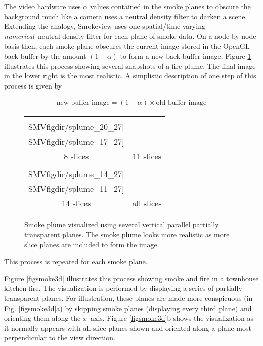 {The video hardware uses $\alpha$ values contained in the smoke
planes to obscure the background much like a camera uses a neutral
density filter to darken a scene.  Extending the analogy,
Smokeview uses one spatial/time varying {\em numerical}\ neutral
density filter for each plane of smoke data.  On a node by node
basis then, each smoke plane obscures the current image stored in
the OpenGL back buffer by the amount $(1-\alpha)$ to form a new
back buffer image.  Figure \ref{figplume} illustrates this process
showing several snapshots of a fire plume. The final image in the
lower right is the most realistic. A simplistic description of one
step of this process is given by

\begin{eqnarray}
\mbox{new buffer image} = (1-\alpha)\times \mbox{old buffer image}
\end{eqnarray}

\begin{figure}[bph]
\begin{center}
\begin{tabular}{cc}
\texttt{[image: \\SMVfigdir/splume\_20\_27]}&
\texttt{[image: \\SMVfigdir/splume\_17\_27]}\\
8 slices&11 slices\\
\texttt{[image: \\SMVfigdir/splume\_14\_27]}&
\texttt{[image: \\SMVfigdir/splume\_11\_27]}\\
14 slices&all slices
\end{tabular}
\end{center}
\caption [Smoke plume visualized using several vertical parallel
partially transparent planes.] {Smoke plume visualized using
several vertical parallel partially transparent planes. The smoke
plume looks more realistic as more slice planes are included to
form the image. } \label{figplume}
\end{figure}

\noindent This process is repeated for each smoke plane.

Figure \ref{figsmoke3d} illustrates this process showing smoke and
fire in a townhouse kitchen fire. The visualization is performed
by displaying a series of partially transparent planes. For
illustration, these planes are made more conspicuous (in Fig.
\ref{figsmoke3d}a) by skipping smoke planes (displaying every
third plane) and orienting them along the $x$~axis. Figure
\ref{figsmoke3d}b shows the visualization as it normally appears
with all slice planes shown and oriented along a plane most
perpendicular to the view direction.

}
